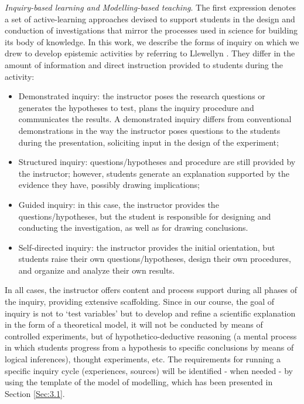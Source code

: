 \documentclass[twocolumn,secnumarabic,amssymb, nobibnotes, aps, prd, nofootinbib]{revtex4-2}
\begin{document}
\emph{Inquiry-based learning and Modelling-based teaching}. The first expression denotes a set of active-learning approaches devised to support students in the design and conduction of investigations that mirror the processes
used in science for building its body of knowledge. In this work, we describe the forms of inquiry on which we drew to develop epistemic activities by referring to Llewellyn \cite{Llewellyn2012}. They differ in the amount of information and direct instruction provided to students during the activity:
\begin{itemize}
    \item Demonstrated inquiry: the instructor poses the research questions or generates the hypotheses to test, plans the inquiry procedure and communicates the results. A demonstrated inquiry differs from conventional demonstrations in the way the instructor poses questions to the students during the presentation, soliciting input in the design of the experiment;
    \item Structured inquiry: questions/hypotheses and procedure are still provided by the instructor; however, students generate an explanation supported by the evidence they have, possibly drawing implications;
    \item Guided inquiry: in this case, the instructor provides the questions/hypotheses, but the student is responsible for designing and conducting the investigation, as well as for drawing conclusions.
    \item Self-directed inquiry: the instructor provides the initial orientation, but students raise their own questions/hypotheses, design their own procedures, and organize and analyze their own results.
\end{itemize}
In all cases, the instructor offers content and process support during all phases of the inquiry, providing extensive scaffolding. Since in our course, the goal of inquiry is not to ‘test variables’ but to develop and refine a scientific explanation in the form of a theoretical model, it will not be conducted by means of controlled experiments, but of hypothetico-deductive reasoning (a mental process in which students progress from a hypothesis to specific conclusions by means of logical inferences), thought experiments, etc. The requirements for running a specific inquiry cycle (experiences, sources) will be identified - when needed - by using the template of the model of modelling, which has been presented in Section \ref{Sec:3.1}.
\end{document}
